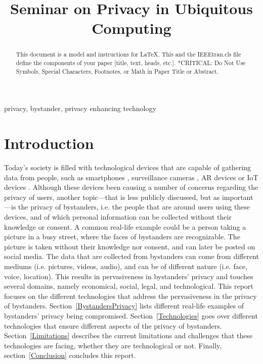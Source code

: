\documentclass[conference]{ieeetran}
\begin{document}
\title{Seminar on Privacy in Ubiquitous Computing}

\author{
\and
{}
}

\maketitle

\begin{abstract}
This document is a model and instructions for \LaTeX.
This and the IEEEtran.cls file define the components of your paper [title, text, heads, etc.]. *CRITICAL: Do Not Use Symbols, Special Characters, Footnotes, 
or Math in Paper Title or Abstract.
\end{abstract}

\begin{IEEEkeywords}
privacy, bystander, privacy enhancing technology
\end{IEEEkeywords}

\section{Introduction}
Today's society is filled with technological devices that are capable of gathering data from people, such as smartphones \cite{lu2017privacy}, surveillance cameras \cite{denning2014situ}, \ac{AR} devices \cite{shu2016cardea} or \ac{IoT} devices \cite{lu2017privacy}. Although these devices been causing a number of concerns regarding the privacy of users, another topic---that is less publicly discussed, but as important---is the privacy of bystanders, i.e. the people that are around users using these devices, and of which personal information can be collected without their knowledge or consent. A common real-life example could be a person taking a picture in a busy street, where the faces of bystanders are recognizable. The picture is taken without their knowledge nor consent, and can later be posted on social media. The data that are collected from bystanders can come from different mediums (i.e. pictures, videos, audio), and can be of different nature (i.e. face, voice, location). This results in pervasiveness in bystanders' privacy and touches several domains, namely economical, social, legal, and technological. This report focuses on the different technologies that address the pervasiveness in the privacy of bystanders. Section~\ref{BystandersPrivacy} lists different real-life examples of bystanders' privacy being compromised. Section~\ref{Technologies} goes over different technologies that ensure different aspects of the privacy of bystanders. Section~\ref{Limitations} describes the current limitations and challenges that these technologies are facing, whether they are technological or not. Finally, section~\ref{Conclusion} concludes this report.
\end{document}
